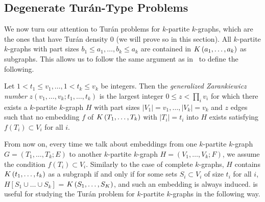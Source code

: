 \subsection{Degenerate Turán-Type Problems}\label{subsec:degenerate}

We now turn our attention to Turán problems for $k$-partite $k$-graphs,
which are the ones that have Turán density $0$ (we will prove so in this section).
All $k$-partite $k$-graphs with part sizes $b_1 \leq a_1, \dots, b_k \leq a_k$
are contained in $K\left(a_1, \dots, a_k\right)$ as subgraphs.
This allows us to follow the same argument as in~
to define the following.

\begin{definition}\label{def:zarankiewicz}
    Let $1 < t_1 \leq v_1, \dots, 1 < t_k \leq v_k$ be integers.
    Then the \emph{generalized Zarankiewicz number} $z(v_1, \dots, v_k; t_1, \dots, t_k)$
    is the largest integer $0 \leq z < \prod_i{ v_i}$ for which there exists a $k$-partite $k$-graph
    $H$ with part sizes $ |V_1| = v_1, \dots, |V_k| = v_k$ and $z$ edges
    such that no embedding $f$ of $K\left(T_1, \dots, T_k\right)$ with $|T_i| = t_i$ into $H$ exists
    satisfying $f(T_i) \subset V_i$ for all $i$.
\end{definition}

From now on, every time we talk about embeddings from one $k$-partite $k$-graph
$G = (T_1, \dots, T_k; E)$ to another $k$-partite $k$-graph $H = (V_1, \dots, V_k; F)$,
we assume the condition $f(T_i) \subset V_i$.
Similarly to the case of complete $k$-graphs,
$H$ contains $K\left(t_1, \dots, t_k\right)$ as a subgraph if and only if
for some sets $S_i \subset V_i$ of size $t_i$ for all $i$,
$H[S_1 \cup \dots \cup S_k]$ = $K\left(S_1, \dots, S_K\right)$,
and such an embedding is always induced.
 is useful for studying the Turán problem for $k$-partite $k$-graphs
in the following way.

